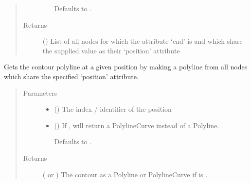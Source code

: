\documentclass[letterpaper,10pt,english]{sphinxmanual}
\begin{document}
\begin{fulllineitems}
\begin{fulllineitems}
\begin{quote}
\begin{description}
\begin{itemize}
Defaults to .


\end{itemize}

\item[{Returns}] \leavevmode
{} () \textendash{} List of all nodes for which the attribute ‘end’ is  and
which share the supplied value as their ‘position’ attribute

\end{description}\end{quote}

\end{fulllineitems}


\begin{fulllineitems}
\label{\detokenize{cockatoo:cockatoo.KnitNetworkBase.geometry_at_position_contour}}
Gets the contour polyline at a given position by making a polyline
from all nodes which share the specified ‘position’ attribute.
\begin{quote}\begin{description}
\item[{Parameters}] \leavevmode\begin{itemize}
\item {} 
 () \textendash{} The index / identifier of the position

\item {} 
 (\sphinxstyleliteralemphasis{\sphinxupquote{, }}) \textendash{} 
If , will return a PolylineCurve instead of a Polyline.

Defaults to .


\end{itemize}

\item[{Returns}] \leavevmode
{} ( or ) \textendash{} The contour as a Polyline or PolylineCurve if  is .


\end{description}
\end{quote}
\end{fulllineitems}
\end{fulllineitems}
\end{document}

